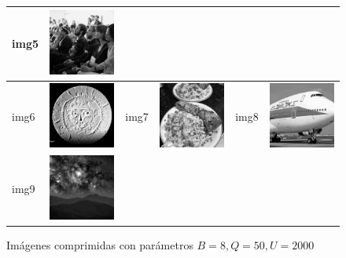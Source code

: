 \documentclass{article}
\begin{document}
\begin{figure}
\begin{center}
\begin{tabular}[t]{|ll|ll|ll|}
img5 & \includegraphics[width=4cm]{../imgs/output/gray_8_50_2000/img05.png} \\
\hline
img6 & \includegraphics[width=4cm]{../imgs/output/gray_8_50_2000/img06.png} &
img7 & \includegraphics[width=4cm]{../imgs/output/gray_8_50_2000/img07.png} &
img8 & \includegraphics[width=4cm]{../imgs/output/gray_8_50_2000/img08.png} \\
\hline
img9 & \includegraphics[width=4cm]{../imgs/output/gray_8_50_2000/img09.png} &&&& \\
\hline
\end{tabular}
\end{center}
\caption{Imágenes comprimidas con parámetros $B=8, Q=50, U=2000$}
\label{fig:imagenes_de_prueba_8_20_5000}
\end{figure}
\end{document}
